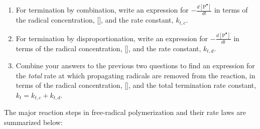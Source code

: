 \begin{activity}
\begin{ctqs}
		\begin{enumerate}
			\item For termination by combination, write an expression for $-\frac{d[\text{P}^{\bullet}]}{dt}$ in terms of the radical concentration, [], and the rate constant, $k_{t,c}$.
			
				\begin{solution}[0.75in]
				\end{solution}
			
			\item For termination by disproportionation, write an expression for $-\frac{d[\text{P}^{\bullet}]}{dt}$ in terms of the radical concentration, [], and the rate constant, $k_{t,d}$.
			
				\begin{solution}[0.75in]
				\end{solution}
			
			\item Combine your answers to the previous two questions to find an expression for the \emph{total} rate at which propagating radicals are removed from the reaction, in terms of the radical concentration, [], and the total termination rate constant, $k_t = k_{t,c} + k_{t,d}$.
			
				\begin{solution}[0.75in]
				\end{solution}
				
		\end{enumerate}

\end{ctqs}



\begin{model}
\label{\labelbase:mdl:kineticssummary}

	The major reaction steps in free-radical polymerization and their rate laws are summarized below:
	

\end{model}
\end{activity}
